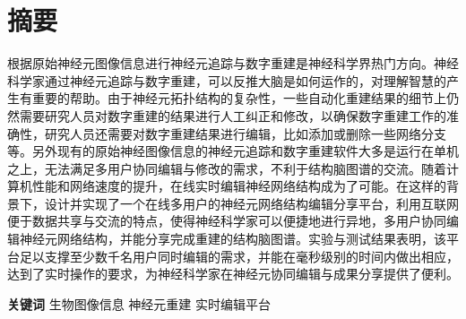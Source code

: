 \chapter{摘要}

根据原始神经元图像信息进行神经元追踪与数字重建是神经科学界热门方向。神经科学家通过神经元追踪与数字重建，可以反推大脑是如何运作的，对理解智慧的产生有重要的帮助。由于神经元拓扑结构的复杂性，一些自动化重建结果的细节上仍然需要研究人员对数字重建的结果进行人工纠正和修改，以确保数字重建工作的准确性，研究人员还需要对数字重建结果进行编辑，比如添加或删除一些网络分支等。另外现有的原始神经图像信息的神经元追踪和数字重建软件大多是运行在单机之上，无法满足多用户协同编辑与修改的需求，不利于结构脑图谱的交流。随着计算机性能和网络速度的提升，在线实时编辑神经网络结构成为了可能。在这样的背景下，设计并实现了一个在线多用户的神经元网络结构编辑分享平台，利用互联网便于数据共享与交流的特点，使得神经科学家可以便捷地进行异地，多用户协同编辑神经元网络结构，并能分享完成重建的结构脑图谱。实验与测试结果表明，该平台足以支撑至少数千名用户同时编辑的需求，并能在毫秒级别的时间内做出相应，达到了实时操作的要求，为神经科学家在神经元协同编辑与成果分享提供了便利。

{
    \vspace{1em}
    \setlength{\parindent}{0em}
    \textbf{关键词} \; 生物图像信息 \; 神经元重建 \; 实时编辑平台 \par
}